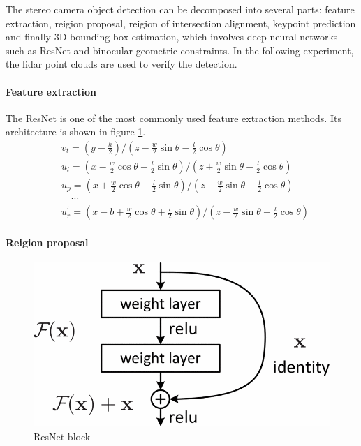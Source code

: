 \documentclass[balance,upint,subscriptcorrection,varvw,nofoot, mathalfa=cal=boondoxo,spanish,french,vietnamese,russian,greek,pdf-a,fontspec,colorlinks]{asmeconf}
\begin{document}
The stereo camera object detection can be decomposed into several parts: feature extraction, reigion proposal, reigion of intersection alignment, keypoint prediction and finally 3D bounding box estimation, which involves deep neural networks such as ResNet and binocular geometric constraints. In the following experiment, the lidar point clouds are used to verify the detection.
\paragraph{Feature extraction} The ResNet is one of the most commonly used feature extraction methods. Its architecture is shown in figure \ref{res}.
\begin{equation}
    \begin{aligned}
&v_{t}=\left(y-\frac{h}{2}\right) /\left(z-\frac{w}{2} \sin \theta-\frac{l}{2} \cos \theta\right) \\
&u_{l}=\left(x-\frac{w}{2} \cos \theta-\frac{l}{2} \sin \theta\right) /\left(z+\frac{w}{2} \sin \theta-\frac{l}{2} \cos \theta\right) \\
&u_{p}=\left(x+\frac{w}{2} \cos \theta-\frac{l}{2} \sin \theta\right) /\left(z-\frac{w}{2} \sin \theta-\frac{l}{2} \cos \theta\right) \\
&\quad \cdots \\
&u_{r}^{\prime}=\left(x-b+\frac{w}{2} \cos \theta+\frac{l}{2} \sin \theta\right) /\left(z-\frac{w}{2} \sin \theta+\frac{l}{2} \cos \theta\right)
\end{aligned}
\end{equation}

\paragraph{Reigion proposal}

\begin{figure}
\centering\includegraphics[width=0.7\linewidth]{resnet.png}
\caption{ResNet block}\label{res}
\end{figure}
\end{document}
